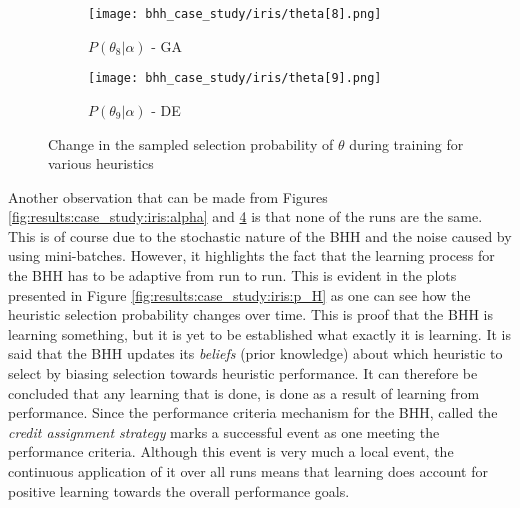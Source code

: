 \begin{figure}[htbp]
\begin{subfigure}{0.5\textwidth}
		\label{fig:results:case_study:iris:p_theta:7}
	\end{subfigure}
	\par\medskip
	\begin{subfigure}{0.5\textwidth}
		\centering
		\texttt{[image: bhh\_case\_study/iris/theta[8].png]}
		\caption{$P(\theta_{8} | \alpha)$ - \Acs{GA}}
		\label{fig:results:case_study:iris:p_theta:8}
	\end{subfigure}
	\begin{subfigure}{0.5\textwidth}
		\centering
		\texttt{[image: bhh\_case\_study/iris/theta[9].png]}
		\caption{$P(\theta_{9} | \alpha)$ - \Acs{DE}}
		\label{fig:results:case_study:iris:p_theta:9}
	\end{subfigure}
	\par\medskip
	\caption{Change in the sampled selection probability of $\theta$ during training for various heuristics}
	\label{fig:results:case_study:iris:p_theta}
\end{figure}








Another observation that can be made from Figures \ref{fig:results:case_study:iris:alpha} and \ref{fig:results:case_study:iris:p_theta} is that none of the runs are the same. This is of course due to the stochastic nature of the \Acs{BHH} and the noise caused by using mini-batches. However, it highlights the fact that the learning process for the \Acs{BHH} has to be adaptive from run to run. This is evident in the plots presented in Figure \ref{fig:results:case_study:iris:p_H} as one can see how the heuristic selection probability changes over time. This is proof that the \Ac{BHH} is learning something, but it is yet to be established what exactly it is learning. It is said that the \Acs{BHH} updates its \textit{beliefs} (prior knowledge) about which heuristic to select by biasing selection towards heuristic performance. It can therefore be concluded that any learning that is done, is done as a result of learning from performance. Since the performance criteria mechanism for the \Ac{BHH}, called the \textit{credit assignment strategy} marks a successful event as one meeting the performance criteria. Although this event is very much a local event, the continuous application of it over all runs means that learning does account for positive learning towards the overall performance goals.




